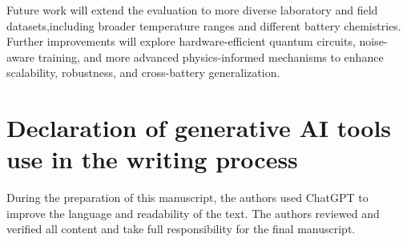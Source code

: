 \documentclass[a4paper,fleqn]{cas-sc}
\begin{document}
Future work will extend the evaluation to more diverse laboratory and field datasets,including broader temperature ranges and different battery chemistries. Further improvements will explore hardware-efficient quantum circuits, noise-aware training, and more advanced physics-informed mechanisms to enhance scalability, robustness, and cross-battery generalization.


\printcredits

\section*{Declaration of generative AI tools use in the writing process}
During the preparation of this manuscript, the authors used ChatGPT to improve the language and readability of the text. The authors reviewed and verified all content and take full responsibility for the final manuscript.





\end{document}

